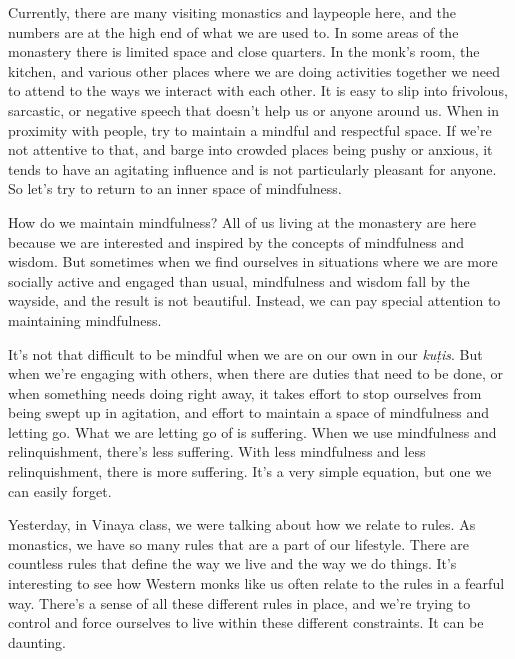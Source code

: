 
Currently, there are many visiting monastics and laypeople here, and 
the numbers are at the high end of what we are used to. In some areas 
of the monastery there is limited space and close quarters. In the 
monk's room, the kitchen, and various other places where we are doing 
activities together we need to attend to the ways we interact with each 
other. It is easy to slip into frivolous, sarcastic, or negative speech 
that doesn't help us or anyone around us. When in proximity with 
people, try to maintain a mindful and respectful space. If we're not 
attentive to that, and barge into crowded places being pushy or 
anxious, it tends to have an agitating influence and is not 
particularly pleasant for anyone. So let's try to return to an inner 
space of mindfulness.

How do we maintain mindfulness? All of us living at the monastery are 
here because we are interested and inspired by the concepts of 
mindfulness and wisdom. But sometimes when we find ourselves in 
situations where we are more socially active and engaged than usual, 
mindfulness and wisdom fall by the wayside, and the result is not 
beautiful. Instead, we can pay special attention to maintaining 
mindfulness.

It's not that difficult to be mindful when we are on our own in our 
\emph{kuṭis}. But when we're engaging with others, when there are 
duties that need to be done, or when something needs doing right away, 
it takes effort to stop ourselves from being swept up in agitation, and 
effort to maintain a space of mindfulness and letting go. What we are 
letting go of is suffering. When we use mindfulness and relinquishment, 
there's less suffering. With less mindfulness and less relinquishment, 
there is more suffering. It's a very simple equation, but one we can 
easily forget.


Yesterday, in Vinaya class, we were talking about how we relate to 
rules. As monastics, we have so many rules that are a part of our 
lifestyle. There are countless rules that define the way we live and 
the way we do things. It's interesting to see how Western monks like us 
often relate to the rules in a fearful way. There's a sense of all 
these different rules in place, and we're trying to control and force 
ourselves to live within these different constraints. It can be 
daunting.

